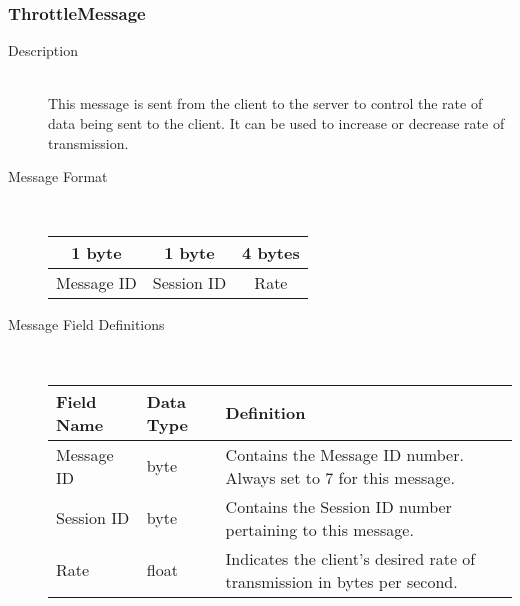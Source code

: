 \documentclass[12pt,letterpaper,titlepage]{article}
\begin{document}
\subsubsection{ThrottleMessage}
	\begin{description}
	\item[Description] \hfill \\
		This message is sent from the client to the server to control the rate of data being sent to the client. It can be used to increase or decrease rate of transmission.
	\item[Message Format] \hfill \\
	\begin{tabular}{ | c | c | c | }
		\hline
		1 byte & 1 byte & 4 bytes \\
		\hline
		Message ID & Session ID & Rate \\
		\hline
	\end{tabular}
	\item[Message Field Definitions] \hfill \\
	\begin{tabular}{ | p{3cm} | p{1.5cm} | p{8cm} | }
		\hline
		Field Name & Data Type & Definition \\
		\hline
		Message ID & byte & Contains the Message ID number. 
					\newline Always set to 7 for this message. \\
		\hline
		Session ID & byte & Contains the Session ID number pertaining to this message. \\
		\hline
        Rate & float & Indicates the client's desired rate of transmission in bytes per second. \\
        \hline
	\end{tabular}
	\end{description}
\end{document}
